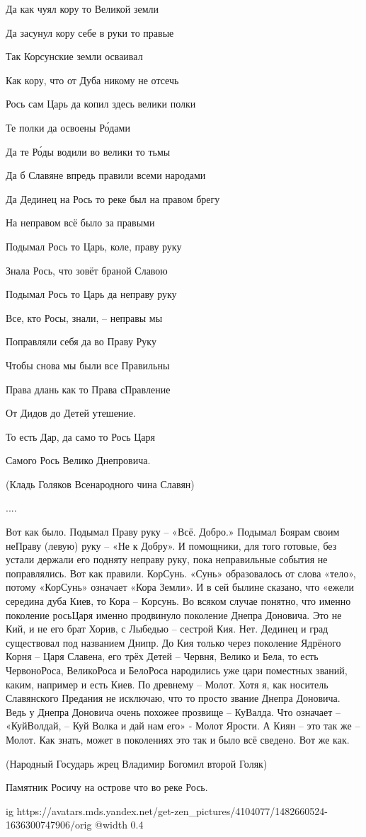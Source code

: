 \begin{itemize}
Да как чуял кору то Великой земли

Да засунул кору себе в руки то правые

Так Корсунские земли осваивал

Как кору, что от Дуба никому не отсечь

Рось сам Царь да копил здесь велики полки

Те полки да освоены Ро́дами

Да те Ро́ды водили во велики то тьмы

Да б Славяне впредь правили всеми народами

Да Дединец на Рось то реке был на правом брегу

На неправом всё было за правыми

Подымал Рось то Царь, коле, праву руку

Знала Рось, что зовёт браной Славою

Подымал Рось то Царь да неправу руку

Все, кто Росы, знали, – неправы мы

Поправляли себя да во Праву Руку

Чтобы снова мы были все Правильны

Права длань как то Права сПравление

От Дидов до Детей утешение.

То есть Дар, да само то Рось Царя

Самого Рось Велико Днепровича.

(Кладь Голяков Всенародного чина Славян)

....

Вот как было. Подымал Праву руку – «Всё. Добро.» Подымал Боярам своим неПраву
(левую) руку – «Не к Добру». И помощники, для того готовые, без устали держали
его подняту неправу руку, пока неправильные события не поправлялись. Вот как
правили. КорСунь. «Сунь» образовалось от слова «тело», потому «КорСунь»
означает «Кора Земли». И в сей былине сказано, что «ежели середина дуба Киев,
то Кора – Корсунь. Во всяком случае понятно, что именно поколение росьЦаря
именно продвинуло поколение Днепра Доновича. Это не Кий, и не его брат Хорив, с
Лыбедью – сестрой Кия. Нет. Дединец и град существовал под названием Днипр. До
Кия только через поколение Ядрёного Корня – Царя Славена, его трёх Детей –
Червня, Велико и Бела, то есть ЧервоноРоса, ВеликоРоса и БелоРоса народились
уже цари поместных званий, каким, например и есть Киев. По древнему – Молот.
Хотя я, как носитель Славянского Предания не исключаю, что то просто звание
Днепра Доновича. Ведь у Днепра Доновича очень похожее прозвище – КуВалда. Что
означает – «КуйВолдай, – Куй Волка и дай нам его» - Молот Ярости. А Киян – это
так же – Молот. Как знать, может в поколениях это так и было всё сведено. Вот
же как.

(Народный Государь жрец Владимир Богомил второй Голяк)

Памятник Росичу на острове что во реке Рось.

\ifcmt
  ig https://avatars.mds.yandex.net/get-zen_pictures/4104077/1482660524-1636300747906/orig
  @width 0.4
\fi


\end{itemize} %
